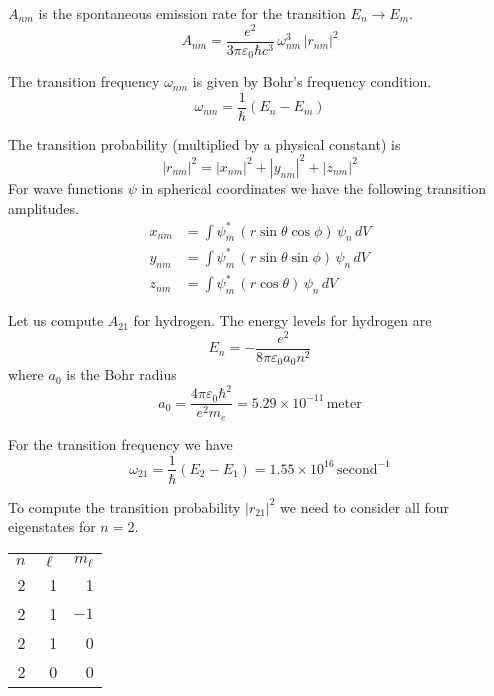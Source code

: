 \documentclass[12pt]{article}
\begin{document}
\noindent
$A_{nm}$ is the spontaneous emission rate for the transition $E_n\rightarrow E_m$.
\begin{equation*}
A_{nm}=\frac{e^2}{3\pi\varepsilon_0\hbar c^3}\,\omega_{nm}^3\,|r_{nm}|^2
\end{equation*}

\noindent
The transition frequency $\omega_{nm}$ is given by Bohr's frequency condition.
\begin{equation*}
\omega_{nm}=\frac{1}{\hbar}(E_n-E_m)
\end{equation*}

\noindent
The transition probability (multiplied by a physical constant) is
\begin{equation*}
|r_{nm}|^2
=|x_{nm}|^2
+|y_{nm}|^2
+|z_{nm}|^2
\end{equation*}
For wave functions $\psi$ in spherical coordinates we have the following transition amplitudes.
\begin{align*}
x_{nm}&=\int\psi_m^*\,(r\sin\theta\cos\phi)\,\psi_n\,dV
\\
y_{nm}&=\int\psi_m^*\,(r\sin\theta\sin\phi)\,\psi_n\,dV
\\
z_{nm}&=\int\psi_m^*\,(r\cos\theta)\,\psi_n\,dV
\end{align*}

\noindent
Let us compute $A_{21}$ for hydrogen.
The energy levels for hydrogen are
\begin{equation*}
E_n=-\frac{e^2}{8\pi\varepsilon_0 a_0n^2}
\end{equation*}
where $a_0$ is the Bohr radius
\begin{equation*}
a_0=\frac{4\pi\varepsilon_0\hbar^2}{e^2 m_e}
=5.29\times10^{-11}\,\text{meter}
\end{equation*}

\noindent
For the transition frequency we have
\begin{equation*}
\omega_{21}=\frac{1}{\hbar}(E_2-E_1)
=1.55\times10^{16}\,\text{second}^{-1}
\end{equation*}

\noindent
To compute the transition probability $|r_{21}|^2$ we need to
consider all four eigenstates for $n=2$.
\begin{center}
\begin{tabular}{rrr}
$n$ & $\ell$ & $m_\ell$\\
2 & 1 & 1 \\
2 & 1 & $-1$ \\
2 & 1 & 0 \\
2 & 0 & 0
\end{tabular}
\end{center}
\end{document}
